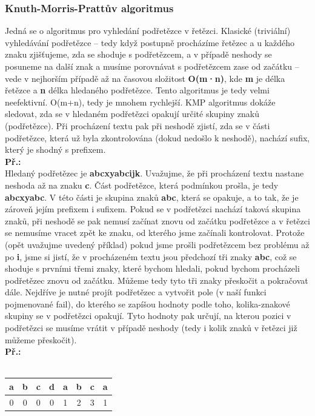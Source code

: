 \documentclass[12pt, a4paper]{article}
\begin{document}
			\subsubsection{Knuth-Morris-Prattův algoritmus}
				Jedná se o algoritmus pro vyhledání podřetězce v řetězci. Klasické (triviální) vyhledávání podřetězce – tedy když postupně procházíme řetězec a u každého znaku zjišťujeme, zda se shoduje s podřetězcem, a v případě neshody se posuneme na další znak a musíme porovnávat s podřetězcem zase od začátku – vede v nejhorším případě až na časovou složitost \textbf{O(m·n)}, kde \textbf{m} je délka řetězce a \textbf{n} délka hledaného podřetězce. Tento algoritmus je tedy velmi neefektivní. O(m+n), tedy je mnohem rychlejší. KMP algoritmus dokáže sledovat, zda se v hledaném podřetězci opakují určité skupiny znaků (podřetězce). Při procházení textu pak při neshodě zjistí, zda se v části podřetězce, která už byla zkontrolována (dokud nedošlo k neshodě), nachází sufix, který je shodný s prefixem.\\
				\textbf{Př.:}\\
				Hledaný podřetězec je \textbf{abcxyabcijk}. Uvažujme, že při procházení textu nastane neshoda až na znaku \textbf{c}. Část podřetězce, která podmínkou prošla, je tedy \textbf{abcxyabc}. V této části je skupina znaků \textbf{abc}, která se opakuje, a to tak, že je zároveň jejím prefixem i sufixem.
				Pokud se v podřetězci nachází taková skupina znaků, při neshodě se pak nemusí začínat znovu od začátku podřetězce a v řetězci se nemusíme vracet zpět ke znaku, od kterého jsme začínali kontrolovat. Protože (opět uvažujme uvedený příklad) pokud jsme prošli podřetězcem bez problému až po \textbf{i}, jsme si jistí, že v procházeném textu jsou předchozí tři znaky \textbf{abc}, což se shoduje s prvními třemi znaky, které bychom hledali, pokud bychom procházeli podřetězec znovu od začátku. Můžeme tedy tyto tři znaky přeskočit a pokračovat dále.
				Nejdříve je nutné projít podřetězec a vytvořit pole (v naší funkci pojmenované fail), do kterého se zapíšou hodnoty podle toho, kolika-znakové skupiny se v podřetězci opakují. Tyto hodnoty pak určují, na kterou pozici v podřetězci se musíme vrátit v případě neshody (tedy i kolik znaků v řetězci již můžeme přeskočit).\\
				\textbf{Př.:}\\\\
				\begin{center}
					\begin{tabular}{|c|c|c|c|c|c|c|c|}
						\hline 
						a & b & c & d & a & b & c & a \\ 
						\hline 
						0 & 0 & 0 & 0 & 1 & 2 & 3 & 1 \\ 
						\hline 
					\end{tabular}\\
				\end{center}
\end{document}
